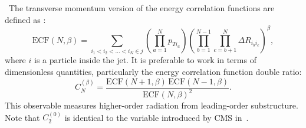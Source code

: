 ~The transverse momentum version of the energy correlation functions are defined as \cite{Larkoski:2013eya}:
%
\begin{equation}
\mathrm{ECF}(N,\beta) = \sum_{i_1 < i_2<\ldots<i_N \in j} \left(\prod_{a=1}^N p_{T i_a}\right)\left( \prod_{b=1}^{N-1} \prod_{c=b+1}^N \Delta R_{i_b i_c}\right)^\beta,
\end{equation}
%
where $i$ is a particle inside the jet. It is preferable to work in terms of dimensionless quantities, particularly the energy correlation function double ratio:
%
\begin{equation}
C_N^{(\beta)} = \frac{\mathrm{ECF}(N+1,\beta)\,\mathrm{ECF}(N-1,\beta)}{\mathrm{ECF}(N,\beta)^2}.
\end{equation}
%
This observable measures higher-order radiation from leading-order substructure. Note that $C_2^{(0)}$ is identical to the variable \ptd introduced by CMS in~\cite{Chatrchyan:2012sn}. 

